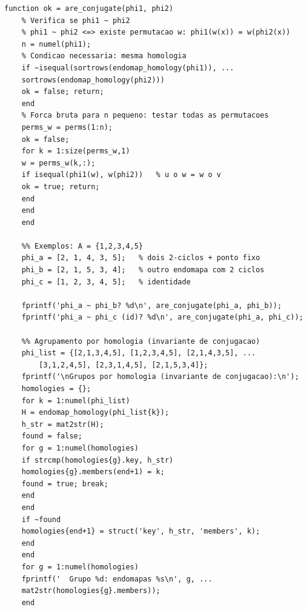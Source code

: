 \begin{lstlisting}[style=matlab, caption={Algoritmo de verificação de conjugação em End(A)}]
	function ok = are_conjugate(phi1, phi2)
	% Verifica se phi1 ~ phi2
	% phi1 ~ phi2 <=> existe permutacao w: phi1(w(x)) = w(phi2(x))
	n = numel(phi1);
	% Condicao necessaria: mesma homologia
	if ~isequal(sortrows(endomap_homology(phi1)), ...
	sortrows(endomap_homology(phi2)))
	ok = false; return;
	end
	% Forca bruta para n pequeno: testar todas as permutacoes
	perms_w = perms(1:n);
	ok = false;
	for k = 1:size(perms_w,1)
	w = perms_w(k,:);
	if isequal(phi1(w), w(phi2))   % u o w = w o v
	ok = true; return;
	end
	end
	end
	
	%% Exemplos: A = {1,2,3,4,5}
	phi_a = [2, 1, 4, 3, 5];   % dois 2-ciclos + ponto fixo
	phi_b = [2, 1, 5, 3, 4];   % outro endomapa com 2 ciclos
	phi_c = [1, 2, 3, 4, 5];   % identidade
	
	fprintf('phi_a ~ phi_b? %d\n', are_conjugate(phi_a, phi_b));
	fprintf('phi_a ~ phi_c (id)? %d\n', are_conjugate(phi_a, phi_c));
	
	%% Agrupamento por homologia (invariante de conjugacao)
	phi_list = {[2,1,3,4,5], [1,2,3,4,5], [2,1,4,3,5], ...
		[3,1,2,4,5], [2,3,1,4,5], [2,1,5,3,4]};
	fprintf('\nGrupos por homologia (invariante de conjugacao):\n');
	homologies = {};
	for k = 1:numel(phi_list)
	H = endomap_homology(phi_list{k});
	h_str = mat2str(H);
	found = false;
	for g = 1:numel(homologies)
	if strcmp(homologies{g}.key, h_str)
	homologies{g}.members(end+1) = k;
	found = true; break;
	end
	end
	if ~found
	homologies{end+1} = struct('key', h_str, 'members', k);
	end
	end
	for g = 1:numel(homologies)
	fprintf('  Grupo %d: endomapas %s\n', g, ...
	mat2str(homologies{g}.members));
	end
\end{lstlisting}